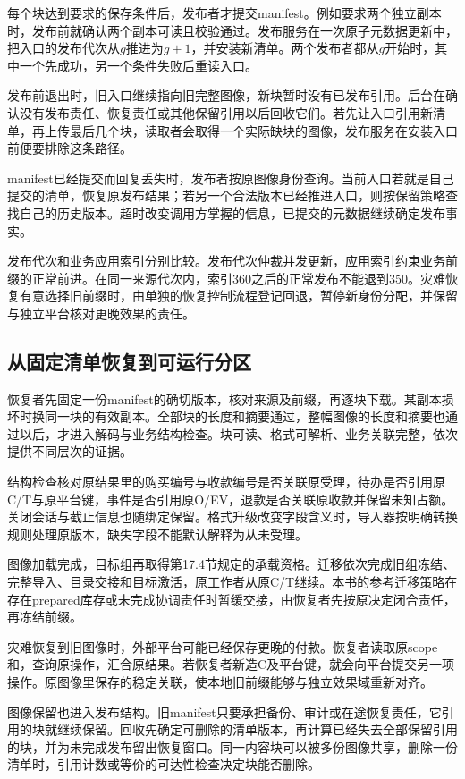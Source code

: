 每个块达到要求的保存条件后，发布者才提交manifest。例如要求两个独立副本时，发布前就确认两个副本可读且校验通过。发布服务在一次原子元数据更新中，把入口的发布代次从$g$推进为$g+1$，并安装新清单。两个发布者都从$g$开始时，其中一个先成功，另一个条件失败后重读入口。


发布前退出时，旧入口继续指向旧完整图像，新块暂时没有已发布引用。后台在确认没有发布责任、恢复责任或其他保留引用以后回收它们。若先让入口引用新清单，再上传最后几个块，读取者会取得一个实际缺块的图像，发布服务在安装入口前便要排除这条路径。

manifest已经提交而回复丢失时，发布者按原图像身份查询。当前入口若就是自己提交的清单，恢复原发布结果；若另一个合法版本已经推进入口，则按保留策略查找自己的历史版本。超时改变调用方掌握的信息，已提交的元数据继续确定发布事实。

发布代次和业务应用索引分别比较。发布代次仲裁并发更新，应用索引约束业务前缀的正常前进。在同一来源代次内，索引360之后的正常发布不能退到350。灾难恢复有意选择旧前缀时，由单独的恢复控制流程登记回退，暂停新身份分配，并保留与独立平台核对更晚效果的责任。

\subsection{从固定清单恢复到可运行分区}

恢复者先固定一份manifest的确切版本，核对来源及前缀，再逐块下载。某副本损坏时换同一块的有效副本。全部块的长度和摘要通过，整幅图像的长度和摘要也通过以后，才进入解码与业务结构检查。块可读、格式可解析、业务关联完整，依次提供不同层次的证据。

结构检查核对原结果里的购买编号与收款编号是否关联原受理，待办是否引用原C/T与原平台键，事件是否引用原O/EV，退款是否关联原收款并保留未知占额。关闭会话与截止信息也随绑定保留。格式升级改变字段含义时，导入器按明确转换规则处理原版本，缺失字段不能默认解释为从未受理。


图像加载完成，目标组再取得第17.4节规定的承载资格。迁移依次完成旧组冻结、完整导入、目录交接和目标激活，原工作者从原C/T继续。本书的参考迁移策略在存在prepared库存或未完成协调责任时暂缓交接，由恢复者先按原决定闭合责任，再冻结前缀。

灾难恢复到旧图像时，外部平台可能已经保存更晚的付款。恢复者读取原scope和，查询原操作，汇合原结果。若恢复者新造C及平台键，就会向平台提交另一项操作。原图像里保存的稳定关联，使本地旧前缀能够与独立效果域重新对齐。

图像保留也进入发布结构。旧manifest只要承担备份、审计或在途恢复责任，它引用的块就继续保留。回收先确定可删除的清单版本，再计算已经失去全部保留引用的块，并为未完成发布留出恢复窗口。同一内容块可以被多份图像共享，删除一份清单时，引用计数或等价的可达性检查决定块能否删除。
\FloatBarrier
